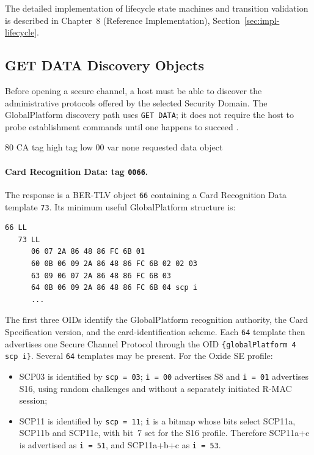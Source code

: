 The detailed implementation of lifecycle state machines and transition
validation is described in Chapter~8 (Reference Implementation),
Section~\ref{sec:impl-lifecycle}.

\subsection{GET DATA Discovery Objects}
\label{sec:gp-get-data-discovery}

Before opening a secure channel, a host must be able to discover the
administrative protocols offered by the selected Security Domain. The
GlobalPlatform discovery path uses \texttt{GET DATA}; it does not require the
host to probe establishment commands until one happens to succeed
.

\apdudesc
{80}
{CA}
{tag high}
{tag low}
{00}
{var}
{none}
{requested data object}

\paragraph{Card Recognition Data: tag \texttt{0066}.}

The response is a BER-TLV object \texttt{66} containing a Card Recognition
Data template \texttt{73}. Its minimum useful GlobalPlatform structure is:

\begin{verbatim}
66 LL
   73 LL
      06 07 2A 86 48 86 FC 6B 01
      60 0B 06 09 2A 86 48 86 FC 6B 02 02 03
      63 09 06 07 2A 86 48 86 FC 6B 03
      64 0B 06 09 2A 86 48 86 FC 6B 04 scp i
      ...
\end{verbatim}

The first three OIDs identify the GlobalPlatform recognition authority, the
Card Specification version, and the card-identification scheme. Each
\texttt{64} template then advertises one Secure Channel Protocol through the
OID \texttt{\{globalPlatform 4 scp i\}}. Several \texttt{64} templates may be
present. For the Oxide SE profile:

\begin{itemize}
\item SCP03 is identified by \texttt{scp = 03}; \texttt{i = 00} advertises
      S8 and \texttt{i = 01} advertises S16, using random challenges and
      without a separately initiated R-MAC session;
\item SCP11 is identified by \texttt{scp = 11}; \texttt{i} is a bitmap whose
      bits select SCP11a, SCP11b and SCP11c, with bit~7 set for the S16
      profile. Therefore SCP11a+c is advertised as \texttt{i = 51}, and
      SCP11a+b+c as \texttt{i = 53}.
\end{itemize}

